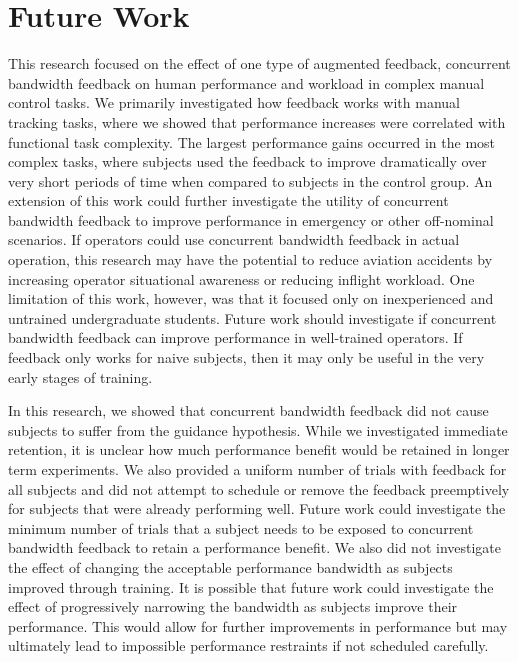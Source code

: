 \section{Future Work}

This research focused on the effect of one type of augmented feedback, concurrent bandwidth feedback on human performance and workload in complex manual control tasks.
We primarily investigated how feedback works with manual tracking tasks, where we showed that performance increases were correlated with functional task complexity.
The largest performance gains occurred in the most complex tasks, where subjects used the feedback to improve dramatically over very short periods of time when compared to subjects in the control group.
An extension of this work could further investigate the utility of concurrent bandwidth feedback to improve performance in emergency or other off-nominal scenarios.
If operators could use concurrent bandwidth feedback in actual operation, this research may have the potential to reduce aviation accidents by increasing operator situational awareness or reducing inflight workload.
One limitation of this work, however, was that it focused only on inexperienced and untrained undergraduate students.
Future work should investigate if concurrent bandwidth feedback can improve performance in well-trained operators.
If feedback only works for naive subjects, then it may only be useful in the very early stages of training.

In this research, we showed that concurrent bandwidth feedback did not cause subjects to suffer from the guidance hypothesis.
While we investigated immediate retention, it is unclear how much performance benefit would be retained in longer term experiments.
We also provided a uniform number of trials with feedback for all subjects and did not attempt to schedule or remove the feedback preemptively for subjects that were already performing well.
Future work could investigate the minimum number of trials that a subject needs to be exposed to concurrent bandwidth feedback to retain a performance benefit.
We also did not investigate the effect of changing the acceptable performance bandwidth as subjects improved through training.
It is possible that future work could investigate the effect of progressively narrowing the bandwidth as subjects improve their performance.
This would allow for further improvements in performance but may ultimately lead to impossible performance restraints if not scheduled carefully.

